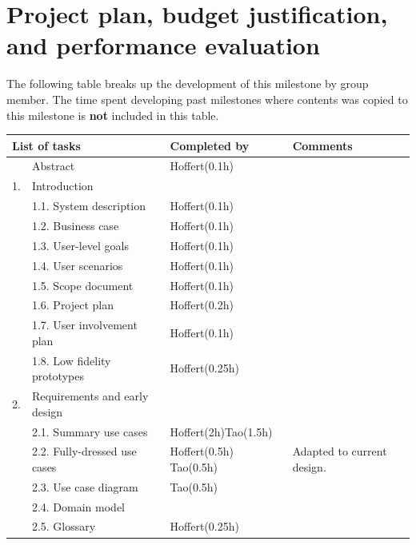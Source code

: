 \documentclass[12pt,a4paper]{article}
\begin{document}
\section{Project plan, budget justification, and performance evaluation}
The following table breaks up the development of this milestone by group member. The time spent developing past milestones where contents was copied to this milestone is \textbf{not} included in this table.

\begin{longtable}{| p{0.2cm} p{6.25cm} | p{3cm}| p{5cm} |}
  \hline
  \multicolumn{2}{|l|}{\textbf{List of tasks}} & \textbf{Completed by} & \textbf{Comments} \\ \hline
   & Abstract & Hoffert(0.1h) &  \\ \hline
  1. & Introduction &  &  \\ \hline
   & 1.1. System description & Hoffert(0.1h) &  \\ \hline
   & 1.2. Business case & Hoffert(0.1h) &  \\ \hline
   & 1.3. User-level goals & Hoffert(0.1h) &  \\ \hline
   & 1.4. User scenarios & Hoffert(0.1h) &  \\ \hline
   & 1.5. Scope document & Hoffert(0.1h) &  \\ \hline
   & 1.6. Project plan & Hoffert(0.2h) &  \\ \hline
   & 1.7. User involvement plan & Hoffert(0.1h) &  \\ \hline
   & 1.8. Low fidelity prototypes & Hoffert(0.25h) &  \\ \hline
  2. & Requirements and early design &  &  \\ \hline
   & 2.1. Summary use cases & Hoffert(2h)\newline Tao(1.5h) &  \\ \hline
   & 2.2. Fully-dressed use cases & Hoffert(0.5h) \newline Tao(0.5h) & Adapted to current design. \\ \hline
   & 2.3. Use case diagram & Tao(0.5h) &  \\ \hline
   & 2.4. Domain model &  &  \\ \hline
   & 2.5. Glossary & Hoffert(0.25h) &  \\ \hline

\end{longtable}
\end{document}
